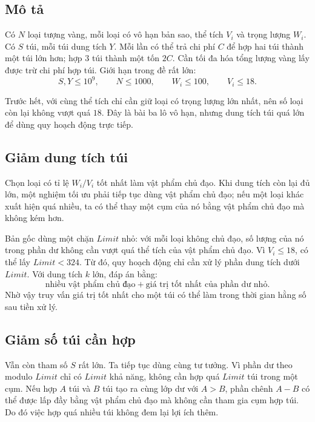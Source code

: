 \documentclass[11pt]{article}
\begin{document}
\subsection{Mô tả}

Có \(N\) loại tượng vàng, mỗi loại có vô hạn bản sao, thể tích \(V_i\) và
trọng lượng \(W_i\). Có \(S\) túi, mỗi túi dung tích \(Y\). Mỗi lần có thể
trả chi phí \(C\) để hợp hai túi thành một túi lớn hơn; hợp \(3\) túi thành
một tốn \(2C\). Cần tối đa hóa tổng lượng vàng lấy được trừ chi phí hợp túi.
Giới hạn trong đề rất lớn:
\[
  S,Y\le 10^9,\qquad N\le 1000,\qquad W_i\le 100,\qquad V_i\le 18.
\]

Trước hết, với cùng thể tích chỉ cần giữ loại có trọng lượng lớn nhất, nên số
loại còn lại không vượt quá \(18\). Đây là bài ba lô vô hạn, nhưng dung tích
túi quá lớn để dùng quy hoạch động trực tiếp.

\subsection{Giảm dung tích túi}

Chọn loại có tỉ lệ \(W_i/V_i\) tốt nhất làm vật phẩm chủ đạo. Khi dung tích
còn lại đủ lớn, một nghiệm tối ưu phải tiếp tục dùng vật phẩm chủ đạo; nếu một
loại khác xuất hiện quá nhiều, ta có thể thay một cụm của nó bằng vật phẩm
chủ đạo mà không kém hơn.

Bản gốc dùng một chặn \(Limit\) nhỏ: với mỗi loại không chủ đạo, số lượng của
nó trong phần dư không cần vượt quá thể tích của vật phẩm chủ đạo. Vì
\(V_i\le 18\), có thể lấy \(Limit < 324\). Từ đó, quy hoạch động chỉ cần xử lý
phần dung tích dưới \(Limit\). Với dung tích \(k\) lớn, đáp án bằng:
\[
  \text{nhiều vật phẩm chủ đạo} + \text{giá trị tốt nhất của phần dư nhỏ}.
\]
Nhờ vậy truy vấn giá trị tốt nhất cho một túi có thể làm trong thời gian hằng
số sau tiền xử lý.

\subsection{Giảm số túi cần hợp}

Vẫn còn tham số \(S\) rất lớn. Ta tiếp tục dùng cùng tư tưởng. Vì phần dư theo
modulo \(Limit\) chỉ có \(Limit\) khả năng, không cần hợp quá \(Limit\) túi
trong một cụm. Nếu hợp \(A\) túi và \(B\) túi tạo ra cùng lớp dư với
\(A>B\), phần chênh \(A-B\) có thể được lấp đầy bằng vật phẩm chủ đạo mà không
cần tham gia cụm hợp túi. Do đó việc hợp quá nhiều túi không đem lại lợi ích
thêm.
\end{document}
